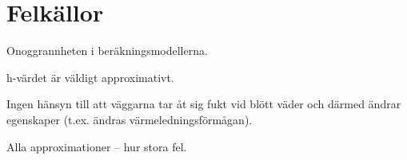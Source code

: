 \section{Felkällor}\label{sec:errors}

Onoggrannheten i beräkningsmodellerna.

h-värdet är väldigt approximativt.

Ingen hänsyn till att väggarna tar åt sig fukt vid blött väder och därmed ändrar egenskaper (t.ex. ändras värmeledningsförmågan). 

Alla approximationer – hur stora fel.

